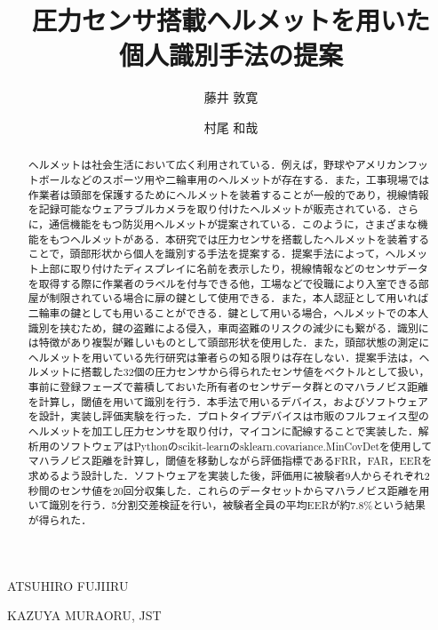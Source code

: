 \documentclass[Japanese,noauthor]{dicomopapers}
\begin{document}
\title{圧力センサ搭載ヘルメットを用いた\\個人識別手法の提案}


\author{藤井 敦寛}{ATSUHIRO FUJII}{RU}
\author{村尾 和哉}{KAZUYA MURAO}{RU, JST}

\begin{abstract}
ヘルメットは社会生活において広く利用されている．例えば，野球やアメリカンフットボールなどのスポーツ用や二輪車用のヘルメットが存在する．また，工事現場では作業者は頭部を保護するためにヘルメットを装着することが一般的であり，視線情報を記録可能なウェアラブルカメラを取り付けたヘルメットが販売されている．さらに，通信機能をもつ防災用ヘルメット\cite{disaster}が提案されている．このように，さまざまな機能をもつヘルメットがある．本研究では圧力センサを搭載したヘルメットを装着することで，頭部形状から個人を識別する手法を提案する．提案手法によって，ヘルメット上部に取り付けたディスプレイに名前を表示したり，視線情報などのセンサデータを取得する際に作業者のラベルを付与できる他，工場などで役職により入室できる部屋が制限されている場合に扉の鍵として使用できる．また，本人認証として用いれば二輪車の鍵としても用いることができる．鍵として用いる場合，ヘルメットでの本人識別を挟むため，鍵の盗難による侵入，車両盗難のリスクの減少にも繋がる．識別には特徴があり複製が難しいものとして頭部形状を使用した．また，頭部状態の測定にヘルメットを用いている先行研究は筆者らの知る限りは存在しない．提案手法は，ヘルメットに搭載した32個の圧力センサから得られたセンサ値をベクトルとして扱い，事前に登録フェーズで蓄積しておいた所有者のセンサデータ群とのマハラノビス距離を計算し，閾値を用いて識別を行う．本手法で用いるデバイス，およびソフトウェアを設計，実装し評価実験を行った．プロトタイプデバイスは市販のフルフェイス型のヘルメットを加工し圧力センサを取り付け，マイコンに配線することで実装した．解析用のソフトウェアはPythonのscikit-learnのsklearn.covariance.MinCovDetを使用してマハラノビス距離を計算し，閾値を移動しながら評価指標であるFRR，FAR，EERを求めるよう設計した．ソフトウェアを実装した後，評価用に被験者9人からそれぞれ2秒間のセンサ値を20回分収集した．これらのデータセットからマハラノビス距離を用いて識別を行う．5分割交差検証を行い，被験者全員の平均EERが約7.8\%という結果が得られた．
\end{abstract}

\maketitle
\end{document}
